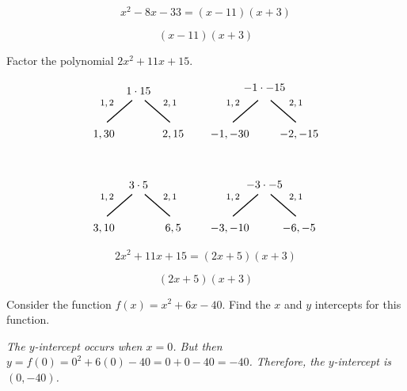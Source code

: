 \documentclass[12pt,letterpaper]{exam}
\begin{document}
\begin{questions}
	\[
	x^2 - 8x - 33= (x - 11)(x + 3)
	\] \pspace
	
	\[
	\boxed{(x - 11)(x + 3)}
	\]





\newpage
\question[5] Factor the polynomial $2x^2 + 11x + 15$. \pspace

	\[
	\begin{tikzpicture}
	\node at (0,0) {$1 \cdot 15$};
	\node at (-1.0,-0.4) {\footnotesize$1, 2$};
	\draw[line width=0.03cm,label={1}] (-0.2,-0.3) -- (-1,-1);
	\node at (-1.1,-1.4) {$1, 30$};
	\node at (1.0,-0.4) {\footnotesize$2, 1$};
	\draw[line width=0.03cm] (0.2,-0.3) -- (1,-1);
	\node at (1.1,-1.4) {$2, 15$};	
	
	\tikzset{shift={(4,0)}}

	\node at (0,0.1) {$-1 \cdot -15$};
	\node at (-1.0,-0.4) {\footnotesize$1, 2$};
	\draw[line width=0.03cm,label={1}] (-0.2,-0.3) -- (-1,-1);
	\node at (-1.1,-1.4) {$-1, -30$};
	\node at (1.0,-0.4) {\footnotesize$2, 1$};
	\draw[line width=0.03cm] (0.2,-0.3) -- (1,-1);
	\node at (1.1,-1.4) {$-2, -15$};
	
	\tikzset{shift={(-4,-3)}}
	
	\node at (0,0) {$3 \cdot 5$};
	\node at (-1.0,-0.4) {\footnotesize$1, 2$};
	\draw[line width=0.03cm,label={1}] (-0.2,-0.3) -- (-1,-1);
	\node at (-1.1,-1.4) {$3, 10$};
	\node at (1.0,-0.4) {\footnotesize$2, 1$};
	\draw[line width=0.03cm] (0.2,-0.3) -- (1,-1);
	\node at (1.1,-1.4) {$6, 5$};
	
	\tikzset{shift={(4,0)}}

	\node at (0,0) {$-3 \cdot -5$};
	\node at (-1.0,-0.4) {\footnotesize$1, 2$};
	\draw[line width=0.03cm,label={1}] (-0.2,-0.3) -- (-1,-1);
	\node at (-1.1,-1.4) {$-3, -10$};
	\node at (1.0,-0.4) {\footnotesize$2, 1$};
	\draw[line width=0.03cm] (0.2,-0.3) -- (1,-1);
	\node at (1.1,-1.4) {$-6, -5$};
	\end{tikzpicture}
	\]

	\[
	2x^2 + 11x + 15= (2x + 5)(x + 3)
	\] \pspace
	
	\[
	\boxed{(2x + 5)(x + 3)}
	\]





\newpage
\question[5] Consider the function $f(x)= x^2 + 6x - 40$. Find the $x$ and $y$ intercepts for this function. \pspace

{\noindent\itshape The $y$-intercept occurs when $x= 0$. But then $y= f(0)= 0^2 + 6(0) - 40= 0 + 0 - 40= -40$. Therefore, the $y$-intercept is $(0, -40)$. \pspace

}
\end{questions}
\end{document}
